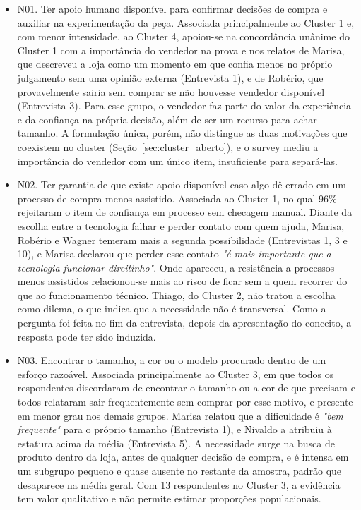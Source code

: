 \begin{itemize}
    \item N01. Ter apoio humano disponível para confirmar decisões de compra e auxiliar na experimentação da peça. Associada principalmente ao Cluster 1 e, com menor intensidade, ao Cluster 4, apoiou-se na concordância unânime do Cluster 1 com a importância do vendedor na prova e nos relatos de Marisa, que descreveu a loja como um momento em que confia menos no próprio julgamento sem uma opinião externa (Entrevista 1), e de Robério, que provavelmente sairia sem comprar se não houvesse vendedor disponível (Entrevista 3). Para esse grupo, o vendedor faz parte do valor da experiência e da confiança na própria decisão, além de ser um recurso para achar tamanho. A formulação única, porém, não distingue as duas motivações que coexistem no cluster (Seção~\ref{sec:cluster_aberto}), e o survey mediu a importância do vendedor com um único item, insuficiente para separá-las.

    \item N02. Ter garantia de que existe apoio disponível caso algo dê errado em um processo de compra menos assistido. Associada ao Cluster 1, no qual 96\% rejeitaram o item de confiança em processo sem checagem manual. Diante da escolha entre a tecnologia falhar e perder contato com quem ajuda, Marisa, Robério e Wagner temeram mais a segunda possibilidade (Entrevistas 1, 3 e 10), e Marisa declarou que perder esse contato \emph{"é mais importante que a tecnologia funcionar direitinho"}. Onde apareceu, a resistência a processos menos assistidos relacionou-se mais ao risco de ficar sem a quem recorrer do que ao funcionamento técnico. Thiago, do Cluster 2, não tratou a escolha como dilema, o que indica que a necessidade não é transversal. Como a pergunta foi feita no fim da entrevista, depois da apresentação do conceito, a resposta pode ter sido induzida.

    \item N03. Encontrar o tamanho, a cor ou o modelo procurado dentro de um esforço razoável. Associada principalmente ao Cluster 3, em que todos os respondentes discordaram de encontrar o tamanho ou a cor de que precisam e todos relataram sair frequentemente sem comprar por esse motivo, e presente em menor grau nos demais grupos. Marisa relatou que a dificuldade é \emph{"bem frequente"} para o próprio tamanho (Entrevista 1), e Nivaldo a atribuiu à estatura acima da média (Entrevista 5). A necessidade surge na busca de produto dentro da loja, antes de qualquer decisão de compra, e é intensa em um subgrupo pequeno e quase ausente no restante da amostra, padrão que desaparece na média geral. Com 13 respondentes no Cluster 3, a evidência tem valor qualitativo e não permite estimar proporções populacionais.


\end{itemize}
